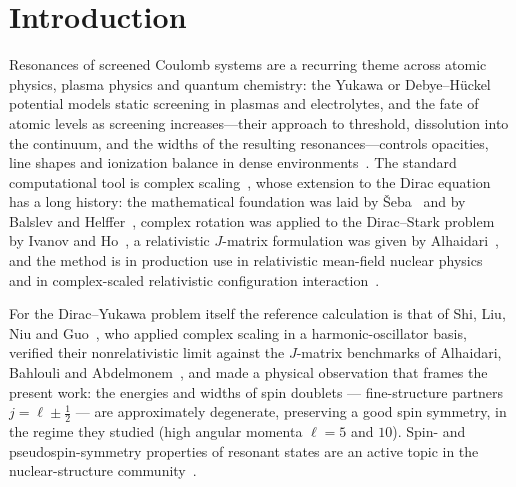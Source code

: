 \documentclass[aps,pra,twocolumn,superscriptaddress,floatfix,longbibliography]{revtex4-2}
\begin{document}
\maketitle

\section{Introduction}

Resonances of screened Coulomb systems are a recurring theme across
atomic physics, plasma physics and quantum chemistry: the Yukawa or
Debye--H\"uckel potential models static screening in plasmas and
electrolytes, and the fate of atomic levels as screening
increases---their approach to threshold, dissolution into the continuum,
and the widths of the resulting resonances---controls opacities, line
shapes and ionization balance in dense
environments~\cite{RogersGraboskeHarwood1970,KarHo2007}. The standard
computational tool is complex scaling~\cite{AguilarCombes1971,
BalslevCombes1971,Ho1983,Moiseyev1998}, whose extension to the Dirac
equation has a long history: the mathematical foundation was laid by
\v{S}eba~\cite{Seba1988} and by Balslev and
Helffer~\cite{BalslevHelffer1992}, complex rotation was applied to the
Dirac--Stark problem by Ivanov and Ho~\cite{IvanovHo2004}, a
relativistic $J$-matrix formulation was given by
Alhaidari~\cite{Alhaidari2007}, and the method is in production use in
relativistic mean-field nuclear physics~\cite{GuoCSM2010} and in
complex-scaled relativistic configuration
interaction~\cite{Zaytsev2019}.

For the Dirac--Yukawa problem itself the reference calculation is that
of Shi, Liu, Niu and Guo~\cite{Shi2014}, who applied complex scaling in
a harmonic-oscillator basis, verified their nonrelativistic limit
against the $J$-matrix benchmarks of Alhaidari, Bahlouli and
Abdelmonem~\cite{Alhaidari2008}, and made a physical observation that
frames the present work: the energies and widths of spin doublets ---
fine-structure partners $j=\ell\pm\tfrac12$ --- are approximately
degenerate, preserving a good spin symmetry, in the regime they
studied (high angular momenta $\ell=5$ and $10$). Spin- and
pseudospin-symmetry properties of resonant states are an active topic
in the nuclear-structure community~\cite{LuZhaoZhou2012}.
\end{document}
